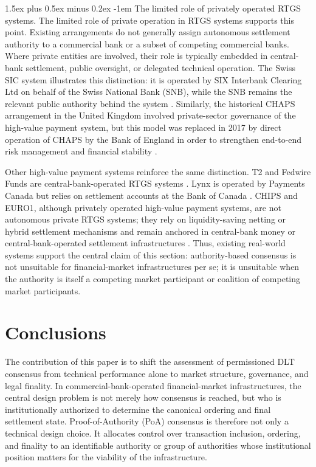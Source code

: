 \documentclass[
reprint,
showkeys,
superscriptaddress,
aps,
pra,
longbibliography,
nofootinbib,
]{revtex4-2}
\makeatletter
\theoremstyle{definition}\newtheorem{definition}{Definition}
\renewcommand\paragraph{%
	\@startsection{paragraph}{4}{\z@}%
	{1.5ex plus 0.5ex minus 0.2ex}%
	{-1em}%
	{\normalfont\normalsize\bfseries}%
}
\makeatother
\begin{document}
\paragraph{The limited role of privately operated RTGS systems.}
The limited role of private operation in RTGS systems supports this point. Existing arrangements do not generally assign autonomous settlement authority to a commercial bank or a subset of competing commercial banks. 
Where private entities are involved, their role is typically embedded in central-bank settlement, public oversight, or delegated technical operation. The Swiss SIC system illustrates this distinction: it is operated by SIX Interbank Clearing Ltd on behalf of the Swiss National Bank (SNB), while the SNB remains the relevant public authority behind the system \cite{snb_sic_2024, snb_sic_web}. Similarly, the historical CHAPS arrangement in the United Kingdom involved private-sector governance of the high-value payment system, but this model was replaced in 2017 by direct operation of CHAPS by the Bank of England in order to strengthen end-to-end risk management and financial stability \cite{boe_chaps_direct_delivery_2017,boe_rtgs_chaps_intro_2025}.


Other high-value payment systems reinforce the same distinction. T2 and Fedwire Funds are central-bank-operated RTGS systems \cite{ecb_t2_2026,fedwire_funds_2024}. 
Lynx is operated by Payments Canada but relies on settlement accounts at the Bank of Canada \cite{canada_lynx_bylaw_2021}. 
CHIPS and EURO1, although privately operated high-value payment systems, are not autonomous private RTGS systems; they rely on liquidity-saving netting or hybrid settlement mechanisms and remain anchored in central-bank money or central-bank-operated settlement infrastructures \cite{chips_tch,eba_euro1_key_features}. 
Thus, existing real-world systems support the central claim of this section: authority-based consensus is not unsuitable for financial-market infrastructures per se; it is unsuitable when the authority is itself a competing market participant or coalition of competing market participants.


\section{Conclusions}
\label{sec:conclusions}
The contribution of this paper is to shift the assessment of permissioned DLT consensus from technical performance alone to market structure, governance, and legal finality. 
In commercial-bank-operated financial-market infrastructures, the central design problem is not merely how consensus is reached, but who is institutionally authorized to determine the canonical ordering and final settlement state. 
Proof-of-Authority (PoA) consensus is therefore not only a technical design choice. 
It allocates control over transaction inclusion, ordering, and finality to an identifiable authority or group of authorities whose institutional position matters for the viability of the infrastructure.
\end{document}
